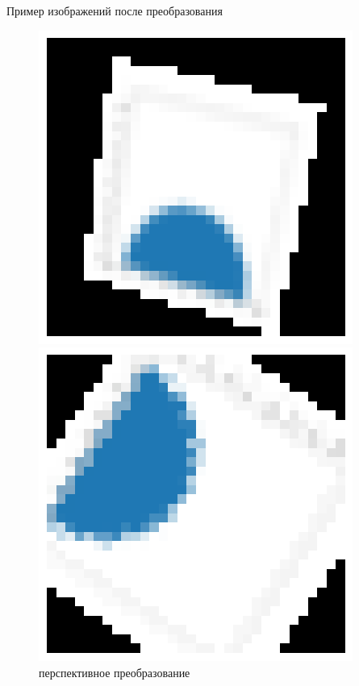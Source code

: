 \documentclass{beamer}
\begin{document}
\begin{frame}{Пример изображений после преобразования}

	\begin{figure}[H]
	\centering
	\begin{minipage}[t]{.3\textwidth}
		\centering
		\includegraphics[width=\linewidth]{./img/perspec.png}
		\caption*{перспективное преобразование}
	\end{minipage}
	\noindent
	\begin{minipage}[t]{.3\textwidth}
		\centering
		\includegraphics[width=\linewidth]{./img/rotate.png}

\end{minipage}
\end{figure}
\end{frame}
\end{document}
